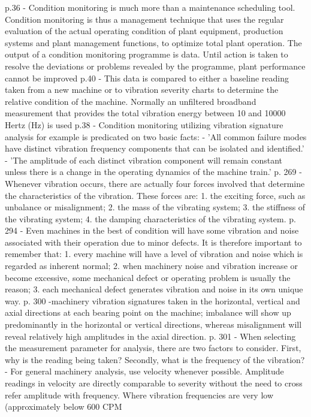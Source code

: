  \cite{davies_techniques_2012}
p.36 - Condition monitoring is much more than a maintenance scheduling tool. Condition monitoring is thus a management technique that uses the regular evaluation of the actual operating condition of plant equipment, production systems and plant management functions, to optimize total plant operation. The output of a condition monitoring programme is data. Until action is taken to resolve the deviations or problems revealed by the programme, plant performance cannot be improved
p.40 - This data is compared to either a baseline reading taken from a new machine or to vibration severity charts to determine the relative condition of the machine. Normally an unfiltered broadband measurement that provides the total vibration energy between 10 and 10000 Hertz (Hz) is used
p.38 - Condition monitoring utilizing vibration signature analysis for example is predicated on two basic facts: 
- 'All common failure modes have distinct vibration frequency components that can be isolated and identified.'
-  'The amplitude of each distinct vibration component will remain constant unless there is a change in the operating dynamics of the machine train.'
p. 269 - Whenever vibration occurs, there are actually four forces involved that determine the characteristics of the vibration. These forces are: 1. the exciting force, such as unbalance or misalignment; 2. the mass of the vibrating system; 3. the stiffness of the vibrating system; 4. the damping characteristics of the vibrating system.
p. 294 - Even machines in the best of condition will have some vibration and noise associated with their operation due to minor defects. It is therefore important to remember that:
 1. every machine will have a level of vibration and noise which is regarded as inherent normal; 
 2. when machinery noise and vibration increase or become excessive, some mechanical defect or operating problem is usually the reason; 
 3. each mechanical defect generates vibration and noise in its own unique way.
p. 300 -machinery vibration signatures taken in the horizontal, vertical and axial directions at each bearing point on the machine; imbalance will show up predominantly in the horizontal or vertical directions, whereas misalignment will reveal relatively high amplitudes in the axial direction.
p. 301 
- When selecting the measurement parameter for analysis, there are two factors to consider. First, why is the reading being taken? Secondly, what is the frequency of the vibration?
- For general machinery analysis, use velocity whenever possible. Amplitude readings in velocity are directly comparable to severity without the need to cross refer amplitude with frequency. Where vibration frequencies are very low (approximately below 600 CPM
